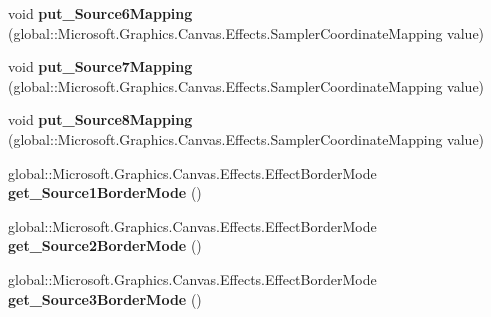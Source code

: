 \begin{DoxyCompactItemize}
\item 
\mbox{\label{interface_microsoft_1_1_graphics_1_1_canvas_1_1_effects_1_1_i_pixel_shader_effect_abea398fdbe9c89ce60caf7362077b915}} 
void {\bfseries put\+\_\+\+Source6\+Mapping} (global\+::\+Microsoft.\+Graphics.\+Canvas.\+Effects.\+Sampler\+Coordinate\+Mapping value)
\item 
\mbox{\label{interface_microsoft_1_1_graphics_1_1_canvas_1_1_effects_1_1_i_pixel_shader_effect_a7a2284df621b17cc4b6f65a4735a0164}} 
void {\bfseries put\+\_\+\+Source7\+Mapping} (global\+::\+Microsoft.\+Graphics.\+Canvas.\+Effects.\+Sampler\+Coordinate\+Mapping value)
\item 
\mbox{\label{interface_microsoft_1_1_graphics_1_1_canvas_1_1_effects_1_1_i_pixel_shader_effect_a4412862fc0d4bf86049cc54d3d405bee}} 
void {\bfseries put\+\_\+\+Source8\+Mapping} (global\+::\+Microsoft.\+Graphics.\+Canvas.\+Effects.\+Sampler\+Coordinate\+Mapping value)
\item 
\mbox{\label{interface_microsoft_1_1_graphics_1_1_canvas_1_1_effects_1_1_i_pixel_shader_effect_a3f3b1fe495c7cf45e0095cdc4dabc530}} 
global\+::\+Microsoft.\+Graphics.\+Canvas.\+Effects.\+Effect\+Border\+Mode {\bfseries get\+\_\+\+Source1\+Border\+Mode} ()
\item 
\mbox{\label{interface_microsoft_1_1_graphics_1_1_canvas_1_1_effects_1_1_i_pixel_shader_effect_adaad058c92ff725212c0e5e7f869f53d}} 
global\+::\+Microsoft.\+Graphics.\+Canvas.\+Effects.\+Effect\+Border\+Mode {\bfseries get\+\_\+\+Source2\+Border\+Mode} ()
\item 
\mbox{\label{interface_microsoft_1_1_graphics_1_1_canvas_1_1_effects_1_1_i_pixel_shader_effect_ab37ff2aeadc28e8128683be2360a48bc}} 
global\+::\+Microsoft.\+Graphics.\+Canvas.\+Effects.\+Effect\+Border\+Mode {\bfseries get\+\_\+\+Source3\+Border\+Mode} ()

\end{DoxyCompactItemize}
